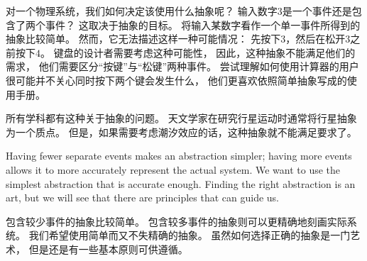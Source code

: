 \documentclass[fleqn,leqno]{article}
\begin{document}
\begin{ch}
  对一个物理系统，我们如何决定该使用什么抽象呢？
  输入数字$3$是一个事件还是包含了两个事件？
  这取决于抽象的目标。
  将输入某数字看作一个单一事件所得到的抽象比较简单。
  然而，它无法描述这样一种可能情况：
  先按下$3$，然后在松开$3$之前按下$4$。
  键盘的设计者需要考虑这种可能性，
  因此，这种抽象不能满足他们的需求，
  他们需要区分``按键''与``松键''两种事件。
  尝试理解如何使用计算器的用户很可能并不关心同时按下两个键会发生什么，
  他们更喜欢依照简单抽象写成的使用手册。

  所有学科都有这种关于抽象的问题。
  天文学家在研究行星运动时通常将行星抽象为一个质点。
  但是，如果需要考虑潮汐效应的话，这种抽象就不能满足要求了。
\end{ch}

\begin{en}
Having fewer separate events makes an abstraction simpler; having more
events allows it to more accurately represent the actual system.  We
want to use the simplest abstraction that is accurate enough.  Finding
the right abstraction is an art, but we will see that there are
principles that can guide us.
\end{en}

\begin{ch}
  包含较少事件的抽象比较简单。
  包含较多事件的抽象则可以更精确地刻画实际系统。
  我们希望使用简单而又不失精确的抽象。
  虽然如何选择正确的抽象是一门艺术，
  但是还是有一些基本原则可供遵循。
\end{ch}
\end{document}
